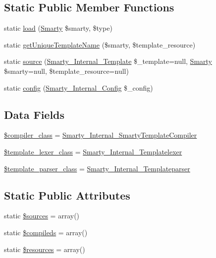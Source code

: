 \subsection*{Static Public Member Functions}
\begin{DoxyCompactItemize}
\item 
static \hyperlink{class_smarty___resource_a2b320f88df7863acf1240938712b76ee}{load} (\hyperlink{class_smarty}{Smarty} \$smarty, \$type)
\item 
static \hyperlink{class_smarty___resource_a31842686eab6038c1e27657d7e865195}{get\+Unique\+Template\+Name} (\$smarty, \$template\+\_\+resource)
\item 
static \hyperlink{class_smarty___resource_ab6ac6b66dac2da6c41a178102f7d53e4}{source} (\hyperlink{class_smarty___internal___template}{Smarty\+\_\+\+Internal\+\_\+\+Template} \$\+\_\+template=null, \hyperlink{class_smarty}{Smarty} \$smarty=null, \$template\+\_\+resource=null)
\item 
static \hyperlink{class_smarty___resource_ab49eec019121574d97b0c3123b207007}{config} (\hyperlink{class_smarty___internal___config}{Smarty\+\_\+\+Internal\+\_\+\+Config} \$\+\_\+config)
\end{DoxyCompactItemize}
\subsection*{Data Fields}
\begin{DoxyCompactItemize}
\item 
\hyperlink{class_smarty___resource_a7696818dcf593c5f9471d7f76ea2e645}{\$compiler\+\_\+class} = \textquotesingle{}\hyperlink{class_smarty___internal___smarty_template_compiler}{Smarty\+\_\+\+Internal\+\_\+\+Smarty\+Template\+Compiler}\textquotesingle{}
\item 
\hyperlink{class_smarty___resource_a134f002da1134c7b756f1d48c9b2ad56}{\$template\+\_\+lexer\+\_\+class} = \textquotesingle{}\hyperlink{class_smarty___internal___templatelexer}{Smarty\+\_\+\+Internal\+\_\+\+Templatelexer}\textquotesingle{}
\item 
\hyperlink{class_smarty___resource_a5861bfb4f75ed665b42ce8eba8ae51f8}{\$template\+\_\+parser\+\_\+class} = \textquotesingle{}\hyperlink{class_smarty___internal___templateparser}{Smarty\+\_\+\+Internal\+\_\+\+Templateparser}\textquotesingle{}
\end{DoxyCompactItemize}
\subsection*{Static Public Attributes}
\begin{DoxyCompactItemize}
\item 
static \hyperlink{class_smarty___resource_aa4b437d19a2caf088c80e03e1539a316}{\$sources} = array()
\item 
static \hyperlink{class_smarty___resource_a6a3acf741a450a04c9af2c5627e44ed3}{\$compileds} = array()
\item 
static \hyperlink{class_smarty___resource_ad57e7e99506ffd448d98e036b1a8da50}{\$resources} = array()
\end{DoxyCompactItemize}
